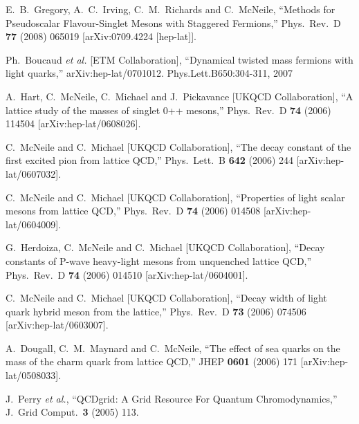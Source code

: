 \begin{thebibliography}{130}
  E.~B.~Gregory, A.~C.~Irving, C.~M.~Richards and C.~McNeile,
  ``Methods for Pseudoscalar Flavour-Singlet Mesons with Staggered Fermions,''
Phys.\ Rev.\  D {\bf 77} (2008) 065019
  [arXiv:0709.4224 [hep-lat]].

  Ph.~Boucaud {\it et al.}  [ETM Collaboration],
  ``Dynamical twisted mass fermions with light quarks,''
  arXiv:hep-lat/0701012. Phys.Lett.B650:304-311, 2007

  A.~Hart, C.~McNeile, C.~Michael and J.~Pickavance  [UKQCD Collaboration],
  ``A lattice study of the masses of singlet 0++ mesons,''
  Phys.\ Rev.\ D {\bf 74} (2006) 114504
[arXiv:hep-lat/0608026].

  C.~McNeile and C.~Michael  [UKQCD Collaboration],
  ``The decay constant of the first excited pion from lattice QCD,''
  Phys.\ Lett.\ B {\bf 642} (2006) 244
  [arXiv:hep-lat/0607032].

  C.~McNeile and C.~Michael  [UKQCD Collaboration],
  ``Properties of light scalar mesons from lattice QCD,''
  Phys.\ Rev.\ D {\bf 74} (2006) 014508
  [arXiv:hep-lat/0604009].

  G.~Herdoiza, C.~McNeile and C.~Michael  [UKQCD Collaboration],
  ``Decay constants of P-wave heavy-light mesons from unquenched lattice
  QCD,''
  Phys.\ Rev.\ D {\bf 74} (2006) 014510
  [arXiv:hep-lat/0604001].

  C.~McNeile and C.~Michael  [UKQCD Collaboration],
  ``Decay width of light quark hybrid meson from the lattice,''
  Phys.\ Rev.\ D {\bf 73} (2006) 074506
  [arXiv:hep-lat/0603007].

  A.~Dougall, C.~M.~Maynard and C.~McNeile,
  ``The effect of sea quarks on the mass of the charm quark from lattice
  QCD,''
  JHEP {\bf 0601} (2006) 171
  [arXiv:hep-lat/0508033].

  J.~Perry {\it et al.},
  ``QCDgrid: A Grid Resource For Quantum Chromodynamics,''
  J.\ Grid Comput.\  {\bf 3} (2005) 113.


\end{thebibliography}

